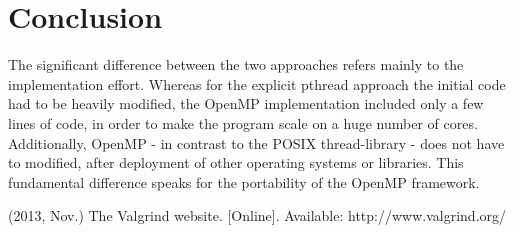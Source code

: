 \documentclass[conference]{IEEEtran}
\begin{document}





\section{Conclusion} 
\label{sec:conclusion}


The significant difference between the two approaches refers mainly to the implementation effort. Whereas for the explicit pthread approach the initial code had to be heavily modified, the OpenMP implementation included only a few lines of code, in order to make the program scale on a huge number of cores. Additionally, OpenMP - in contrast to the POSIX thread-library - does not have to modified, after deployment of other operating systems or libraries. This fundamental difference speaks for the portability of the OpenMP framework. 




% 
% 







%
%
%


\begin{thebibliography}{1}
% 
(2013, Nov.) The Valgrind website. [Online]. Available: http://www.valgrind.org/
% 
\end{thebibliography}




\end{document}
